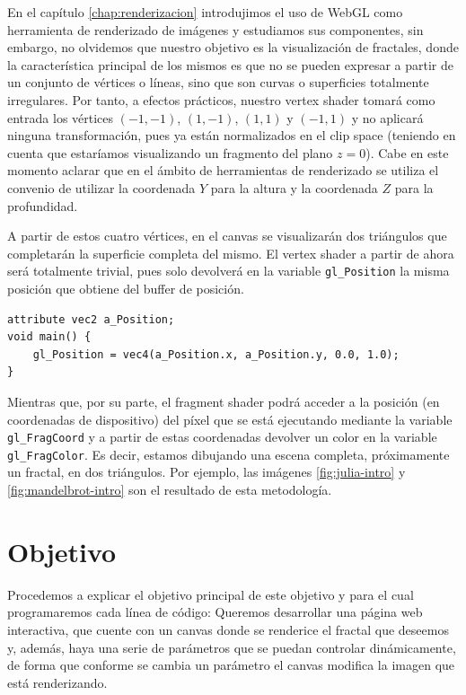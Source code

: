 %
%

En el capítulo \ref{chap:renderizacion} introdujimos el uso de WebGL como herramienta de renderizado de imágenes y estudiamos sus componentes, sin embargo, no olvidemos que nuestro objetivo es la visualización de fractales, donde la característica principal de los mismos es que no se pueden expresar a partir de un conjunto de vértices o líneas, sino que son curvas o superficies totalmente irregulares. Por tanto, a efectos prácticos, nuestro vertex shader tomará como entrada los vértices $(-1,-1)$, $(1,-1)$, $(1,1)$ y $(-1,1)$ y no aplicará ninguna transformación, pues ya están normalizados en el clip space (teniendo en cuenta que estaríamos visualizando un fragmento del plano $z=0$). Cabe en este momento aclarar que en el ámbito de herramientas de renderizado se utiliza el convenio de utilizar la coordenada $Y$ para la altura y la coordenada $Z$ para la profundidad. 

A partir de estos cuatro vértices, en el canvas se visualizarán dos triángulos que completarán la superficie completa del mismo. El vertex shader a partir de ahora será totalmente trivial, pues solo devolverá en la variable \verb|gl_Position| la misma posición que obtiene del buffer de posición.

\begin{lstlisting}
attribute vec2 a_Position;
void main() {
    gl_Position = vec4(a_Position.x, a_Position.y, 0.0, 1.0);
}
\end{lstlisting}

Mientras que, por su parte, el fragment shader podrá acceder a la posición (en coordenadas de dispositivo) del píxel que se está ejecutando mediante la variable \verb|gl_FragCoord| y a partir de estas coordenadas devolver un color en la variable \verb|gl_FragColor|. Es decir, estamos dibujando una escena completa, próximamente un fractal, en dos triángulos. Por ejemplo, las imágenes \ref{fig:julia-intro} y \ref{fig:mandelbrot-intro} son el resultado de esta metodología. 

\section{Objetivo}

Procedemos a explicar el objetivo principal de este objetivo y para el cual programaremos cada línea de código: Queremos desarrollar una página web interactiva, que cuente con un canvas donde se renderice el fractal que deseemos y, además, haya una serie de parámetros que se puedan controlar dinámicamente, de forma que conforme se cambia un parámetro el canvas modifica la imagen que está renderizando.

